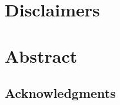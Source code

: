 \documentclass[12pt]{article}
\begin{document}


\section*{Disclaimers}

\pagebreak

\section*{Abstract}

\pagebreak

\begin{center}
\section*{Acknowledgments}
\end{center}


\pagebreak

\newpage

\tableofcontents
\pagebreak


\pagebreak


\pagebreak
{}


\pagebreak


\pagebreak


\pagebreak


\pagebreak


\pagebreak


\pagebreak




\pagebreak


\end{document}
